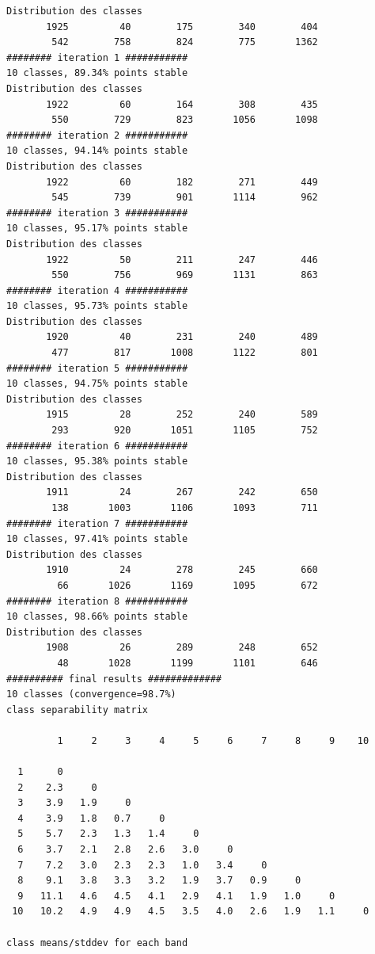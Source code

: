 \documentclass[land,article,submit,pdftex,moreauthors]{Definitions/mdpi}
\begin{document}
\begin{scriptsize}
\begin{verbatim}
Distribution des classes
       1925         40        175        340        404
        542        758        824        775       1362
######## iteration 1 ###########
10 classes, 89.34% points stable
Distribution des classes
       1922         60        164        308        435
        550        729        823       1056       1098
######## iteration 2 ###########
10 classes, 94.14% points stable
Distribution des classes
       1922         60        182        271        449
        545        739        901       1114        962
######## iteration 3 ###########
10 classes, 95.17% points stable
Distribution des classes
       1922         50        211        247        446
        550        756        969       1131        863
######## iteration 4 ###########
10 classes, 95.73% points stable
Distribution des classes
       1920         40        231        240        489
        477        817       1008       1122        801
######## iteration 5 ###########
10 classes, 94.75% points stable
Distribution des classes
       1915         28        252        240        589
        293        920       1051       1105        752
######## iteration 6 ###########
10 classes, 95.38% points stable
Distribution des classes
       1911         24        267        242        650
        138       1003       1106       1093        711
######## iteration 7 ###########
10 classes, 97.41% points stable
Distribution des classes
       1910         24        278        245        660
         66       1026       1169       1095        672
######## iteration 8 ###########
10 classes, 98.66% points stable
Distribution des classes
       1908         26        289        248        652
         48       1028       1199       1101        646
########## final results #############
10 classes (convergence=98.7%)
class separability matrix

         1     2     3     4     5     6     7     8     9    10

  1      0
  2    2.3     0
  3    3.9   1.9     0
  4    3.9   1.8   0.7     0
  5    5.7   2.3   1.3   1.4     0
  6    3.7   2.1   2.8   2.6   3.0     0
  7    7.2   3.0   2.3   2.3   1.0   3.4     0
  8    9.1   3.8   3.3   3.2   1.9   3.7   0.9     0
  9   11.1   4.6   4.5   4.1   2.9   4.1   1.9   1.0     0
 10   10.2   4.9   4.9   4.5   3.5   4.0   2.6   1.9   1.1     0

class means/stddev for each band


\end{verbatim}
\end{scriptsize}
\end{document}
